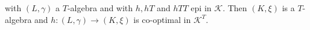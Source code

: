 with $(L, \gamma)$ a $T$-algebra and with $h, hT$ and $hTT$ epi in $\mathcal{K}$. Then $(K, \xi)$ is a $T$-algebra and $h:(L, \gamma) \longrightarrow (K, \xi)$ is co-optimal in $\mathcal{K}^T$.